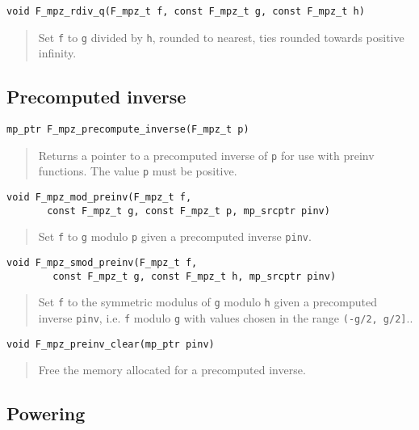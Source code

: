 \documentclass[a4paper,10pt]{article}
\newcommand{\code}{\lstinline}
\begin{document}
\begin{lstlisting}
void F_mpz_rdiv_q(F_mpz_t f, const F_mpz_t g, const F_mpz_t h)
\end{lstlisting}
\begin{quote}
Set \code{f} to \code{g} divided by \code{h}, rounded to nearest, ties rounded towards positive infinity.
\end{quote}

\subsection{Precomputed inverse}

\begin{lstlisting}
mp_ptr F_mpz_precompute_inverse(F_mpz_t p)
\end{lstlisting}
\begin{quote}
Returns a pointer to a precomputed inverse of \code{p} for use with preinv functions. The value \code{p} must be positive.
\end{quote}

\begin{lstlisting}
void F_mpz_mod_preinv(F_mpz_t f, 
       const F_mpz_t g, const F_mpz_t p, mp_srcptr pinv)
\end{lstlisting}
\begin{quote}
Set \code{f} to \code{g} modulo \code{p} given a precomputed inverse \code{pinv}.
\end{quote}

\begin{lstlisting}
void F_mpz_smod_preinv(F_mpz_t f, 
        const F_mpz_t g, const F_mpz_t h, mp_srcptr pinv)
\end{lstlisting}
\begin{quote}
Set \code{f} to the symmetric modulus of \code{g} modulo \code{h} given a precomputed inverse \code{pinv}, i.e. \code{f} modulo \code{g} with values chosen in the range \code{(-g/2, g/2]}..
\end{quote}

\begin{lstlisting}
void F_mpz_preinv_clear(mp_ptr pinv)
\end{lstlisting}
\begin{quote}
Free the memory allocated for a precomputed inverse.
\end{quote}

\subsection{Powering}
\end{document}
